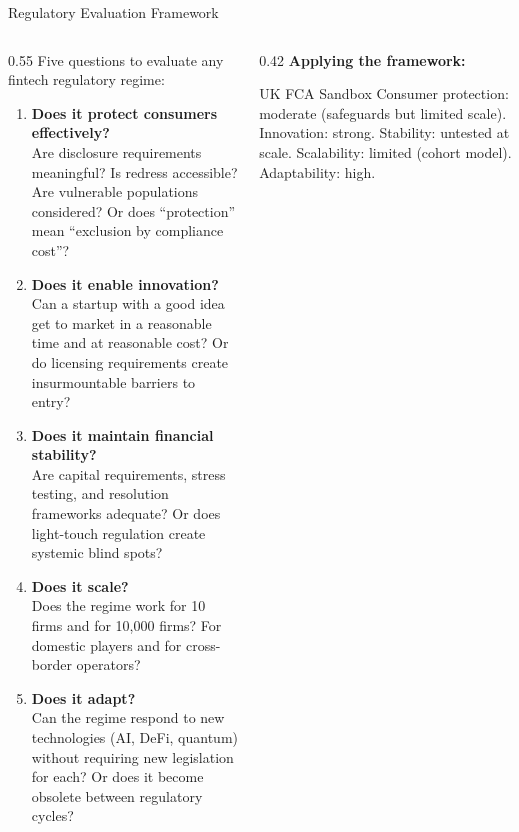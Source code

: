 \begin{frame}{Regulatory Evaluation Framework}
  \begin{columns}[T]
    \begin{column}{0.55\textwidth}
      Five questions to evaluate any fintech regulatory regime:

      \vspace{0.4em}
      \begin{enumerate}
        \item \textbf{Does it protect consumers effectively?}\\
              Are disclosure requirements meaningful? Is redress accessible?
              Are vulnerable populations considered? Or does ``protection''
              mean ``exclusion by compliance cost''?
        \item \textbf{Does it enable innovation?}\\
              Can a startup with a good idea get to market in a reasonable
              time and at reasonable cost? Or do licensing requirements
              create insurmountable barriers to entry?
        \item \textbf{Does it maintain financial stability?}\\
              Are capital requirements, stress testing, and resolution
              frameworks adequate? Or does light-touch regulation create
              systemic blind spots?
        \item \textbf{Does it scale?}\\
              Does the regime work for 10 firms and for 10,000 firms? For
              domestic players and for cross-border operators?
        \item \textbf{Does it adapt?}\\
              Can the regime respond to new technologies (AI, DeFi, quantum)
              without requiring new legislation for each? Or does it become
              obsolete between regulatory cycles?
      \end{enumerate}
    \end{column}
    \begin{column}{0.42\textwidth}
      \textbf{Applying the framework:}

      \vspace{0.4em}
      \begin{block}{UK FCA Sandbox}
        Consumer protection: moderate (safeguards but limited scale).
        Innovation: strong. Stability: untested at scale. Scalability:
        limited (cohort model). Adaptability: high.
      \end{block}


\end{column}
\end{columns}
\end{frame}
